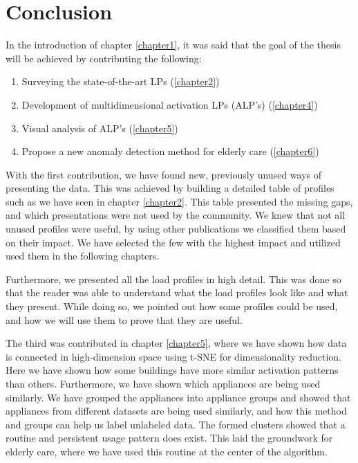 \chapter{Conclusion}
\label{chapter7}

In the introduction of chapter \ref{chapter1}, it was said that the goal of the thesis will be achieved by contributing the following:

\begin{enumerate}
	\item Surveying the state-of-the-art LPs (\ref{chapter2})
	\item Development of multidimensional activation LPs (ALP's) (\ref{chapter4})
	\item Visual analysis of ALP's (\ref{chapter5})
	\item Propose a new anomaly detection method for elderly care (\ref{chapter6})
\end{enumerate}

With the first contribution, we have found new, previously unused ways of presenting the data.
This was achieved by building a detailed table of profiles such as we have seen in chapter \ref{chapter2}.
This table presented the missing gaps, and which presentations were not used by the community.
We knew that not all unused profiles were useful, by using other publications we classified them based on their impact. 
We have selected the few with the highest impact and utilized used them in the following chapters.

Furthermore, we presented all the load profiles in high detail. This was done so that the reader was able to understand what the load profiles look like and what they present.
While doing so, we pointed out how some profiles could be used, and how we will use them to prove that they are useful. 

The third was contributed in chapter \ref{chapter5}, where we have shown how data is connected in high-dimension space
using t-SNE for dimensionality reduction. Here we have shown how some buildings have more similar activation patterns than others.
Furthermore, we have shown which appliances are being used similarly. 
We have grouped the appliances into appliance groups and showed that appliances from different datasets are being used similarly, and how this method and groups can help us label unlabeled data. 
The formed clusters showed that a routine and persistent usage pattern does exist. This laid the groundwork for elderly care, where we have used this routine at the center of the algorithm.

